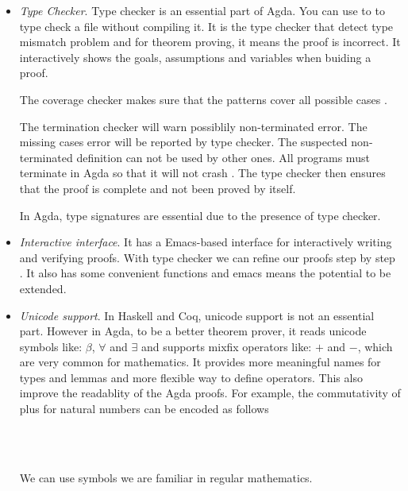 \begin{itemize}
\item \textit{Type Checker}. Type checker is an essential part of Agda. You can use to to type check a file without compiling it. It is the type checker that detect type mismatch problem and for theorem proving, it means the proof is incorrect. It interactively shows the goals, assumptions and variables when buiding a proof. 

The coverage checker makes sure that the patterns cover all possible cases \cite{aboa}. 

The termination checker will warn possiblily non-terminated error. The missing cases error will be reported by type checker. The suspected non-terminated definition can not be used by other ones. All programs must terminate in Agda so that it will not crash \cite{tutorial}.  The type checker then ensures that the proof is complete and not been proved by itself. 

In Agda, type signatures are essential due to the presence of type checker.
 
\item \textit{Interactive interface}. It has a Emacs-based interface for interactively writing and verifying proofs.  With type checker we can refine our proofs step by step \cite{aboa}. It also has some convenient functions and emacs means the potential to be extended.

\item \textit{Unicode support}. In Haskell and Coq, unicode support is not an essential part. However in Agda, to be a better theorem prover, it reads unicode symbols like: $\beta$, $\forall$ and $\exists$ and supports mixfix operators like: $+$ and $-$, which are very common for mathematics. It provides more meaningful names for types and lemmas and more flexible way to define operators. This also improve the readablity of the Agda proofs. For example, the commutativity of plus for natural numbers can be encoded as follows

\begin{code}
%
\\
\> \AgdaSymbol{:}  \AgdaSymbol{(}  \AgdaSymbol{:} \AgdaSymbol{)}   \AgdaFunction{+}    \AgdaFunction{+} \<%
\\
\end{code}

We can use symbols we are familiar in regular mathematics.




\end{itemize}
